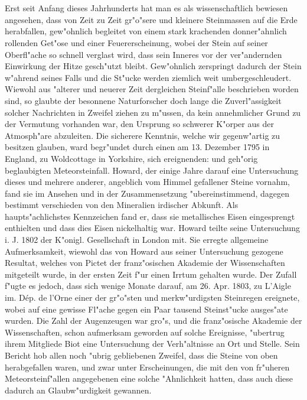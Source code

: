 \documentclass[a4paper, 11pt, oneside]{article}
\begin{document}
\setlength{\parskip}{1mm plus1mm minus1mm}
\clearpage
\pagestyle{fancy}
\fancyhf{}
\cfoot{\swabfamily{\thepage}}
\tableofcontents
\clearpage
\LARGE
\section*{}
\paragraph{}
Erst seit Anfang dieses Jahrhunderts hat man es als wissenschaftlich bewiesen angesehen, dass von Zeit zu Zeit gr"o"sere und kleinere Steinmassen auf die Erde herabfallen, gew"ohnlich begleitet von einem stark krachenden donner"ahnlich rollenden Get"ose und einer Feuererscheinung, wobei der Stein auf seiner Oberfl"ache so schnell verglast wird, dass sein Inneres vor der ver"andernden Einwirkung der Hitze gesch"utzt bleibt. Gew"ohnlich zerspringt dadurch der Stein w"ahrend seines Falls und die St"ucke werden ziemlich weit umbergeschleudert. Wiewohl aus "alterer und neuerer Zeit dergleichen Steinf"alle beschrieben worden sind, so glaubte der besonnene Naturforscher doch lange die Zuverl"assigkeit solcher Nachrichten in Zweifel ziehen zu m"ussen, da kein annehmlicher Grund zu der Vermutung vorhanden war, den Ursprung so schwerer K"orper aus der Atmosph"are abzuleiten. Die sicherere Kenntnis, welche wir gegenw"artig zu besitzen glauben, ward begr"undet durch einen am 13. Dezember 1795 in England, zu Woldcottage in Yorkshire, sich ereignenden: und geh"orig beglaubigten Meteorsteinfall. Howard, der einige Jahre darauf eine Untersuchung dieses und mehrere anderer, angeblich vom Himmel gefallener Steine vornahm, fand sie im Ansehen und in der Zusammensetzung "ubereinstimmend, dagegen bestimmt verschieden von den Mineralien irdischer Abkunft. Als haupts"achlichstes Kennzeichen fand er, dass sie metallisches Eisen eingesprengt enthielten und dass dies Eisen nickelhaltig war. Howard teilte seine Untersuchung i. J. 1802 der K"onigl. Gesellschaft in London mit. Sie erregte allgemeine Aufmerksamkeit, wiewohl das von Howard aus seiner Untersuchung gezogene Resultat, welches von Pictet der franz"osischen Akademie der Wissenschaften mitgeteilt wurde, in der ersten Zeit f"ur einen Irrtum gehalten wurde. Der Zufall f"ugte es jedoch, dass sich wenige Monate darauf, am 26. Apr. 1803, zu L'Aigle im. Dép. de l’Orne einer der gr"o"sten und merkw"urdigsten Steinregen ereignete, wobei auf eine gewisse Fl"ache gegen ein Paar tausend Steinst"ucke ausges"ate wurden. Die Zahl der Augenzeugen war gro"s, und die franz"osische Akademie der Wissenschaften, schon aufmerksam geworden auf solche Ereignisse, "ubertrug ihrem Mitgliede Biot eine Untersuchung der Verh"altnisse an Ort und Stelle. Sein Bericht hob allen noch "ubrig gebliebenen Zweifel, dass die Steine von oben herabgefallen waren, und zwar unter Erscheinungen, die mit den von fr"uheren Meteorsteinf"allen angegebenen eine solche "Ahnlichkeit hatten, dass auch diese dadurch an Glaubw"urdigkeit gewannen.
\end{document}
